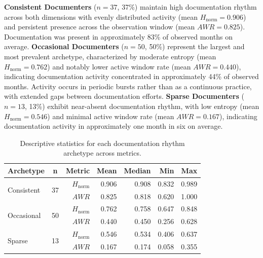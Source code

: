 \documentclass[10pt,conference]{IEEEtran}
\begin{document}
{{\textbf{Consistent Documenters} ($n = 37$, 37\%) maintain
high documentation rhythm across both dimensions with evenly
distributed activity (mean $H_{\text{norm}} = 0.906$) and
persistent presence across the observation window (mean
$AWR = 0.825$).
Documentation was present in approximately
83\% of observed months on average.
\textbf{Occasional Documenters} ($n = 50$, 50\%) represent
the largest and most prevalent archetype, characterized by
moderate entropy (mean $H_{\text{norm}} = 0.762$) and
notably lower active window rate (mean $AWR = 0.440$),
indicating documentation activity concentrated in
approximately 44\% of observed months. Activity occurs in
periodic bursts rather than as a continuous practice, with
extended gaps between documentation efforts. \textbf{Sparse Documenters} ($n = 13$, 13\%) exhibit
near-absent documentation rhythm, with low entropy
(mean $H_{\text{norm}} = 0.546$) and minimal active window
rate (mean $AWR = 0.167$), indicating documentation
activity in approximately one month in six on average.
\vspace{-10pt}
\begin{table}[h]
\centering
\small
\caption{Descriptive statistics for each documentation
rhythm archetype across metrics.}
\label{tab:archetype_stats}
\renewcommand{\arraystretch}{1.3}
\begin{tabular}{lcrrrrr}
\toprule
\textbf{Archetype} & \textbf{n} & \textbf{Metric}
& \textbf{Mean} & \textbf{Median}
& \textbf{Min} & \textbf{Max} \\
\midrule
\multirow{2}{*}{Consistent}
  & \multirow{2}{*}{37}
  & $H_{\text{norm}}$ & 0.906 & 0.908  & 0.832 & 0.989 \\
  &  & $AWR$           & 0.825 & 0.818  & 0.620 & 1.000 \\
\midrule
\multirow{2}{*}{Occasional}
  & \multirow{2}{*}{50}
  & $H_{\text{norm}}$ & 0.762 & 0.758  & 0.647 & 0.848 \\
  &  & $AWR$           & 0.440 & 0.450  & 0.256 & 0.628 \\
\midrule
\multirow{2}{*}{Sparse}
  & \multirow{2}{*}{13}
  & $H_{\text{norm}}$ & 0.546 & 0.534 & 0.406 & 0.637 \\
  &  & $AWR$           & 0.167 & 0.174 & 0.058 & 0.355 \\
\bottomrule
\end{tabular}
\end{table}

}}
\end{document}
